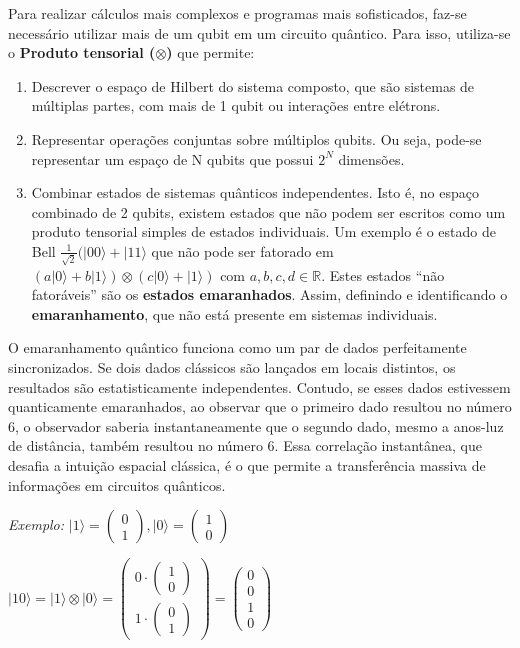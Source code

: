 \documentclass[12pt, a4paper]{article}
\newcommand{\ket}[1]{\lvert #1 \rangle}
\begin{document}
Para realizar cálculos mais complexos e programas mais sofisticados, faz-se necessário utilizar mais de um qubit em um circuito quântico. Para isso, utiliza-se o \textbf{Produto tensorial ($\otimes$)} que permite:
\begin{enumerate}
    \item Descrever o espaço de Hilbert do sistema composto, que são sistemas de múltiplas partes, com mais de 1 qubit ou interações entre elétrons.
    \item Representar operações conjuntas sobre múltiplos qubits. Ou seja, pode-se representar um espaço de N qubits que possui $2^N$ dimensões.
    \item Combinar estados de sistemas quânticos independentes. Isto é, no espaço combinado de 2 qubits, existem estados que não podem ser escritos como um produto tensorial simples de estados individuais. Um exemplo é o estado de Bell \(\frac{1}{\sqrt{2}}(\ket{00}+\ket{11}\) que não pode ser fatorado em \((a\ket{0}+b\ket{1}) \otimes (c\ket{0}+\ket{1})\) com $a,b,c,d\in\mathbb{R}$. Estes estados ``não fatoráveis'' são os \textbf{estados emaranhados}. Assim, definindo e identificando o \textbf{emaranhamento}, que não está presente em sistemas individuais.
\end{enumerate}

O emaranhamento quântico funciona como um par de dados perfeitamente sincronizados. Se dois dados clássicos são lançados em locais distintos, os resultados são estatisticamente independentes. Contudo, se esses dados estivessem quanticamente emaranhados, ao observar que o primeiro dado resultou no número 6, o observador saberia instantaneamente que o segundo dado, mesmo a anos-luz de distância, também resultou no número 6. Essa correlação instantânea, que desafia a intuição espacial clássica, é o que permite a transferência massiva de informações em circuitos quânticos.

\textit{Exemplo:} 
\(\ket{1} = 
\begin{pmatrix}
    0 \\
    1
\end{pmatrix} ,  
\ket{0} = 
\begin{pmatrix}
    1 \\
    0
\end{pmatrix}
\)

\(\ket{10} = \ket{1} \otimes \ket{0} = 
\begin{pmatrix}
    0 \cdot \begin{pmatrix}
        1 \\
        0
    \end{pmatrix} \\
    1 \cdot \begin{pmatrix}
        0 \\
        1
    \end{pmatrix}
\end{pmatrix} = 
\begin{pmatrix}
    0 \\
    0 \\
    1 \\
    0
\end{pmatrix}
\)
\end{document}
